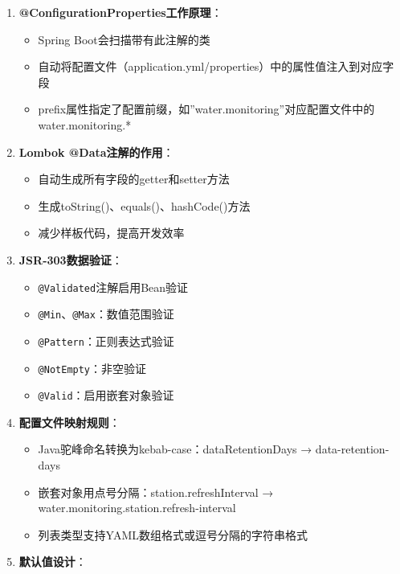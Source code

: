 \begin{enumerate}
\def\labelenumi{\arabic{enumi}.}
\tightlist
\item
  \textbf{@ConfigurationProperties工作原理}：

  \begin{itemize}
  \tightlist
  \item
    Spring Boot会扫描带有此注解的类
  \item
    自动将配置文件（application.yml/properties）中的属性值注入到对应字段
  \item
    prefix属性指定了配置前缀，如''water.monitoring''对应配置文件中的water.monitoring.*
  \end{itemize}
\item
  \textbf{Lombok @Data注解的作用}：

  \begin{itemize}
  \tightlist
  \item
    自动生成所有字段的getter和setter方法
  \item
    生成toString()、equals()、hashCode()方法
  \item
    减少样板代码，提高开发效率
  \end{itemize}
\item
  \textbf{JSR-303数据验证}：

  \begin{itemize}
  \tightlist
  \item
    \texttt{@Validated}注解启用Bean验证
  \item
    \texttt{@Min}、\texttt{@Max}：数值范围验证
  \item
    \texttt{@Pattern}：正则表达式验证
  \item
    \texttt{@NotEmpty}：非空验证
  \item
    \texttt{@Valid}：启用嵌套对象验证
  \end{itemize}
\item
  \textbf{配置文件映射规则}：

  \begin{itemize}
  \tightlist
  \item
    Java驼峰命名转换为kebab-case：dataRetentionDays → data-retention-days
  \item
    嵌套对象用点号分隔：station.refreshInterval → water.monitoring.station.refresh-interval
  \item
    列表类型支持YAML数组格式或逗号分隔的字符串格式
  \end{itemize}
\item
  \textbf{默认值设计}：


\end{enumerate}

